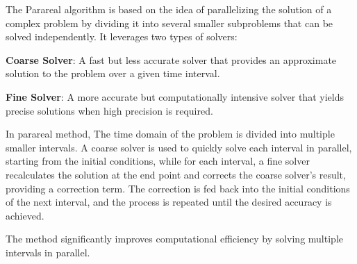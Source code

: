 The Parareal algorithm is based on the idea of parallelizing the solution of a complex problem by dividing it into several smaller subproblems that can be solved independently. It leverages two types of solvers:

{\bf Coarse Solver}: A fast but less accurate solver that provides an approximate solution to the problem over a given time interval.

{\bf Fine Solver}: A more accurate but computationally intensive solver that yields precise solutions when high precision is required.

In parareal method, The time domain of the problem is divided into multiple smaller intervals.
A coarse solver is used to quickly solve each interval in parallel, starting from the initial conditions, 
while for each interval, a fine solver recalculates the solution at the end point and corrects the coarse solver's result, providing a correction term. 
The correction is fed back into the initial conditions of the next interval, and the process is repeated until the desired accuracy is achieved.

The method significantly improves computational efficiency by solving multiple intervals in parallel.

